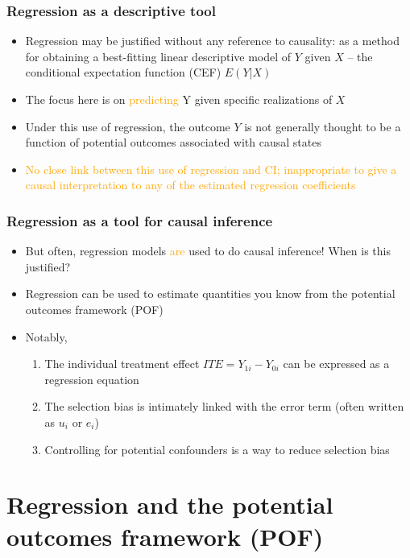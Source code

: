 \documentclass[12pt,english,dvipsnames,aspectratio=169,handout]{beamer}\usepackage[]{graphicx}\usepackage[]{xcolor}
\begin{document}
\begin{frame}
\frametitle{Regression as a descriptive tool}

\begin{itemize}
    \item Regression may be justified without any reference to causality: as a method for obtaining a best-fitting linear descriptive model of $Y$ given $X$ -- the conditional expectation function (CEF)  $E(Y|X)$
    \item The focus here is on \textcolor{orange}{predicting} Y given specific realizations of $X$
    \item Under this use of regression, the outcome $Y$ is not generally thought to be a function of potential outcomes associated with causal states
    \item \textcolor{orange}{No close link between this use of regression and CI; inappropriate to give a causal interpretation to any of the estimated regression coefficients} 
  \end{itemize}
  
\end{frame}


\begin{frame}
\frametitle{Regression as a tool for causal inference}

\begin{itemize}
  \item But often, regression models \textcolor{orange}{are} used to do causal inference! When is this justified?
  \item Regression can be used to estimate quantities you know from the potential outcomes framework (POF)
  \item Notably, 
    \begin{enumerate}
      \item The individual treatment effect $ITE = Y_{1i} - Y_{0i}$ can be expressed as a regression equation
      \item The selection bias is intimately linked with the error term (often written as $u_i$ or $e_i$)
      \item Controlling for potential confounders is a way to reduce selection bias
    \end{enumerate}
\end{itemize}

\end{frame}




\section{Regression and the potential outcomes framework (POF)}
\end{document}
